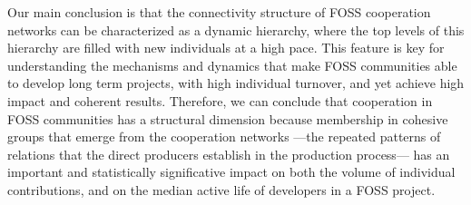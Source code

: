 Our main conclusion is that the connectivity structure of FOSS cooperation networks can be characterized as a dynamic hierarchy, where the top levels of this hierarchy are filled with new individuals at a high pace. This feature is key for understanding the mechanisms and dynamics that make FOSS communities able to develop long term projects, with high individual turnover, and yet achieve high impact and coherent results. Therefore, we can conclude that cooperation in FOSS communities has a structural dimension because membership in cohesive groups that emerge from the cooperation networks ---the repeated patterns of relations that the direct producers establish in the production process--- has an important and statistically significative impact on both the volume of individual contributions, and on the median active life of developers in a FOSS project.
